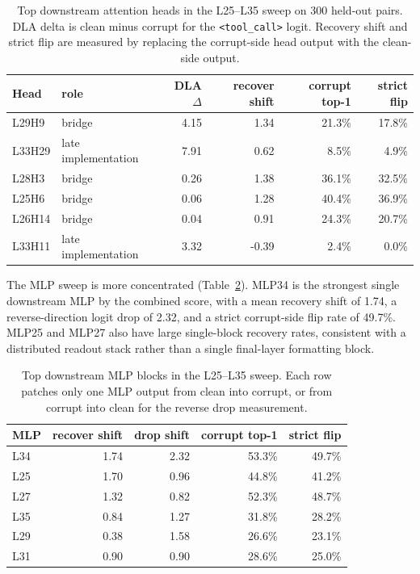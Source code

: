 \begin{table}[t]
  \centering
  \small
  \caption{Top downstream attention heads in the L25--L35 sweep on 300
  held-out pairs.  DLA delta is clean minus corrupt for the
  \texttt{<tool\_call>} logit.  Recovery shift and strict flip are measured by
  replacing the corrupt-side head output with the clean-side output.}
  \label{tab:appendix-readout-heads}
  \begin{tabular}{llrrrr}
    \toprule
    Head & role & DLA $\Delta$ & recover shift & corrupt top-1 & strict flip \\
    \midrule
    L29H9  & bridge & 4.15 & 1.34 & 21.3\% & 17.8\% \\
    L33H29 & late implementation & 7.91 & 0.62 & 8.5\% & 4.9\% \\
    L28H3  & bridge & 0.26 & 1.38 & 36.1\% & 32.5\% \\
    L25H6  & bridge & 0.06 & 1.28 & 40.4\% & 36.9\% \\
    L26H14 & bridge & 0.04 & 0.91 & 24.3\% & 20.7\% \\
    L33H11 & late implementation & 3.32 & -0.39 & 2.4\% & 0.0\% \\
    \bottomrule
  \end{tabular}
\end{table}

The MLP sweep is more concentrated (Table~\ref{tab:appendix-readout-mlps}).
MLP34 is the strongest single downstream MLP by the combined score, with a
mean recovery shift of 1.74, a reverse-direction logit drop of 2.32, and a
strict corrupt-side flip rate of 49.7\%.  MLP25 and MLP27 also have large
single-block recovery rates, consistent with a distributed readout stack
rather than a single final-layer formatting block.

\begin{table}[t]
  \centering
  \small
  \caption{Top downstream MLP blocks in the L25--L35 sweep.  Each row patches
  only one MLP output from clean into corrupt, or from corrupt into clean for
  the reverse drop measurement.}
  \label{tab:appendix-readout-mlps}
  \begin{tabular}{lrrrr}
    \toprule
    MLP & recover shift & drop shift & corrupt top-1 & strict flip \\
    \midrule
    L34 & 1.74 & 2.32 & 53.3\% & 49.7\% \\
    L25 & 1.70 & 0.96 & 44.8\% & 41.2\% \\
    L27 & 1.32 & 0.82 & 52.3\% & 48.7\% \\
    L35 & 0.84 & 1.27 & 31.8\% & 28.2\% \\
    L29 & 0.38 & 1.58 & 26.6\% & 23.1\% \\
    L31 & 0.90 & 0.90 & 28.6\% & 25.0\% \\
    \bottomrule
  \end{tabular}
\end{table}

